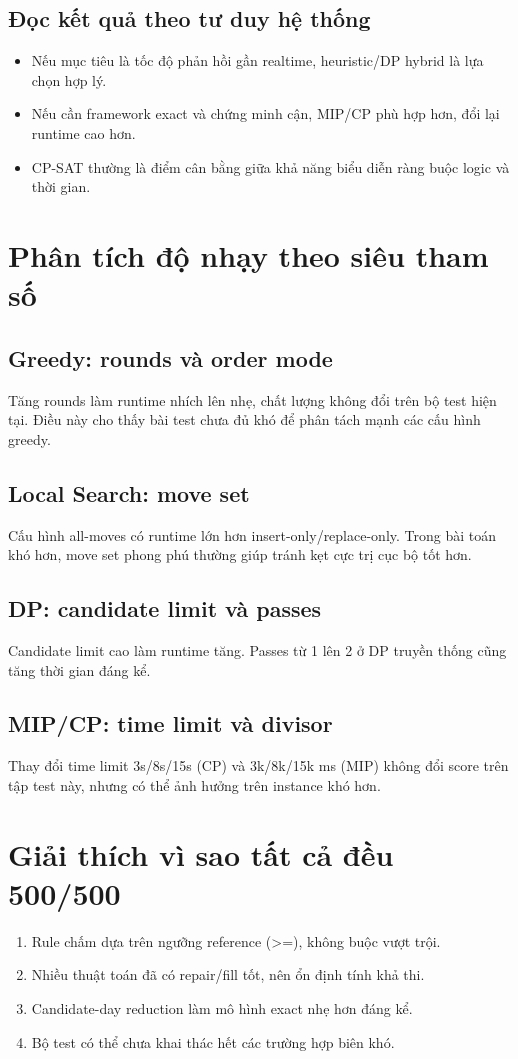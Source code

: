\documentclass[12pt,a4paper]{article}
\begin{document}
\subsection{Đọc kết quả theo tư duy hệ thống}
\begin{itemize}
  \item Nếu mục tiêu là tốc độ phản hồi gần realtime, heuristic/DP hybrid là lựa chọn hợp lý.
  \item Nếu cần framework exact và chứng minh cận, MIP/CP phù hợp hơn, đổi lại runtime cao hơn.
  \item CP-SAT thường là điểm cân bằng giữa khả năng biểu diễn ràng buộc logic và thời gian.
\end{itemize}

\section{Phân tích độ nhạy theo siêu tham số}
\subsection{Greedy: rounds và order mode}
Tăng rounds làm runtime nhích lên nhẹ, chất lượng không đổi trên bộ test hiện tại. Điều này cho thấy bài test chưa đủ khó để phân tách mạnh các cấu hình greedy.

\subsection{Local Search: move set}
Cấu hình all-moves có runtime lớn hơn insert-only/replace-only. Trong bài toán khó hơn, move set phong phú thường giúp tránh kẹt cực trị cục bộ tốt hơn.

\subsection{DP: candidate limit và passes}
Candidate limit cao làm runtime tăng. Passes từ 1 lên 2 ở DP truyền thống cũng tăng thời gian đáng kể.

\subsection{MIP/CP: time limit và divisor}
Thay đổi time limit 3s/8s/15s (CP) và 3k/8k/15k ms (MIP) không đổi score trên tập test này, nhưng có thể ảnh hưởng trên instance khó hơn.

\section{Giải thích vì sao tất cả đều 500/500}
\begin{enumerate}
  \item Rule chấm dựa trên ngưỡng reference (>=), không buộc vượt trội.
  \item Nhiều thuật toán đã có repair/fill tốt, nên ổn định tính khả thi.
  \item Candidate-day reduction làm mô hình exact nhẹ hơn đáng kể.
  \item Bộ test có thể chưa khai thác hết các trường hợp biên khó.
\end{enumerate}
\end{document}
